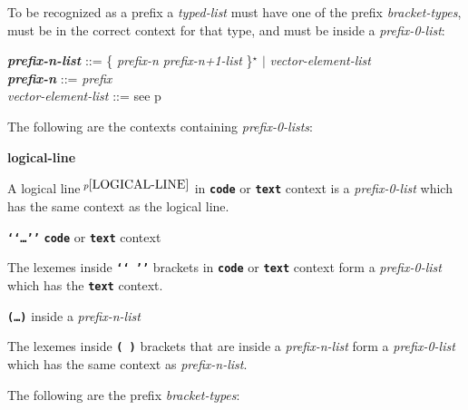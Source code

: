 \documentclass[12pt]{article}
\newcommand{\TT}[1]{{\tt \bfseries #1}}
\newcommand{\key}[1]{{\rm \bfseries #1}}
\newcommand{\ttkey}[1]{{\tt \bfseries #1}}
\newcommand{\emkey}[1]{{\em \bfseries #1}}
\newcommand{\pagref}[1]{p\pageref{#1}}
\newcommand{\pagnote}[1]{$\,^{p\pageref{#1}}$}
\newcommand{\STAR}{{\Large $^\star$}}
\newenvironment{indpar}[1][0.3in]%
	{\begin{list}{}%
		     {\setlength{\itemsep}{0in}%
		      \setlength{\topsep}{0in}%
		      \setlength{\parsep}{1ex}%
		      \setlength{\labelwidth}{#1}%
		      \setlength{\leftmargin}{#1}%
		      \addtolength{\leftmargin}{\labelsep}}%
	 \item}%
	{\end{list}}
\begin{document}
To be recognized as a prefix a {\em typed-list} must have one of the
prefix {\em bracket-types}, must be in the correct context for that
type, and must be inside a {\em prefix-0-list}:

\begin{indpar}[0.2in]

\emkey{prefix-n-list}
    ::= \{ {\em prefix-n} {\em prefix-n+1-list} \}\STAR{}
    $|$ {\em vector-element-list}
\\[0.5ex]
\emkey{prefix-n} ::= {\em prefix}
\\[0.5ex]
{\em vector-element-list} ::= see \pagref{VECTOR-ELEMENT-LIST}

\end{indpar}

The following are the contexts containing {\em prefix-0-lists}:

\begin{indpar}[0.2in]

\key{logical-line}

\begin{indpar}[0.5em]
A logical line\pagnote{LOGICAL-LINE} in \TT{code} or \TT{text} context
is a {\em prefix-0-list} which has the same context as the logical line.
\end{indpar}

\ttkey{`{}`\ldots'{}'} \hfill \TT{code} or \TT{text} context

\begin{indpar}[0.5em]
The lexemes inside \TT{`{}`~'{}'} brackets 
in \TT{code} or \TT{text} context
form a {\em prefix-0-list} which has the \TT{text} context.
\end{indpar}

\ttkey{(\ldots)} \hfill inside a {\em prefix-n-list}

\begin{indpar}[0.5em]
The lexemes inside \TT{(~)} brackets that are inside a {\em prefix-n-list}
form a {\em prefix-0-list} which has the same context as {\em prefix-n-list}.
\end{indpar}

\end{indpar}

The following are the prefix {\em bracket-types}:
\end{document}
